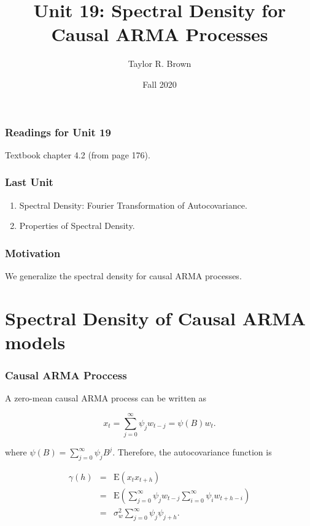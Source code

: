 \documentclass[%
xcolor=pdftex]{beamer}
\title{Unit 19: Spectral Density for Causal ARMA Processes}
\author[STAT 5170: Applied Time Series, Unit 19]{Taylor R. Brown}
\institute{Department of Statistics, University of Virginia}
\date{Fall 2020}
\begin{document}
\frame{\titlepage}

\begin{frame}
\frametitle{Readings for Unit 19}

Textbook chapter 4.2 (from page 176).

\end{frame}


\begin{frame}
\frametitle{Last Unit}
\begin{enumerate}
\item Spectral Density: Fourier Transformation of Autocovariance.
\item Properties of Spectral Density.
\end{enumerate}
\end{frame}

\begin{frame}
\frametitle{Motivation}

We generalize the spectral density for causal ARMA processes.

\end{frame}

\section{Spectral Density of Causal ARMA models}
\frame{\tableofcontents[currentsection]}

\begin{frame}
\frametitle{Causal ARMA Proccess}

A zero-mean causal ARMA process can be written as

$$
x_t = \sum_{j=0}^{\infty} \psi_j w_{t-j} = \psi(B)w_t.
$$

where $\psi(B) = \sum_{j=0}^{\infty} \psi_j B^j$. Therefore, the autocovariance function is

\begin{eqnarray*}
\gamma(h) &=& \mbox{E}(x_t x_{t+h}) \\
          &=& \mbox{E}(\sum_{j=0}^{\infty} \psi_j w_{t-j} \sum_{i=0}^{\infty} \psi_i w_{t+h-i}) \\
          &=& \sigma_w^2 \sum_{j=0}^{\infty} \psi_j \psi_{j+h}.
\end{eqnarray*}

\end{frame}

%
%
%
\end{document}
